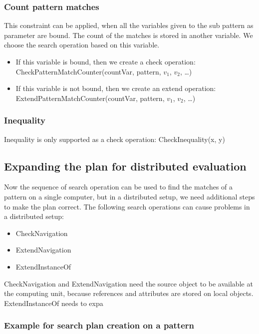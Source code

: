 \subsubsection{Count pattern matches}

This constraint can be applied, when all the variables given to the sub pattern as parameter are bound. 
The count of the matches is stored in another variable. 
We choose the search operation based on this variable.

\begin{itemize}
	\item If this variable is bound, then we create a check operation: 
	CheckPatternMatchCounter(countVar, pattern, $v_1$, $v_2$, \dots{})
	\item If this variable is not bound, then we create an extend operation: 
	ExtendPatternMatchCounter(countVar, pattern, $v_1$, $v_2$, \dots{})
\end{itemize}


\subsubsection{Inequality}
Inequality is only supported as a check operation: CheckInequality(x, y)


\subsection{Expanding the plan for distributed evaluation}
Now the sequence of search operation can be used to find the matches of a pattern on a single computer, but in a distributed setup, we need additional steps to make the plan correct.
The following search operations can cause problems in a distributed setup:
\begin{itemize}
	\item CheckNavigation	
	\item ExtendNavigation
	\item ExtendInstanceOf
\end{itemize}

CheckNavigation and ExtendNavigation need the source object to be available at the computing unit, because references and attributes are stored on local objects.
ExtendInstanceOf needs to expa

\subsubsection{Example for search plan creation on a pattern }


